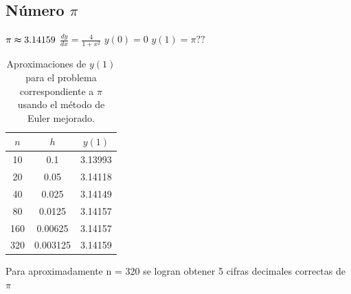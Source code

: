 \documentclass[12pt,a4paper]{article}
\begin{document}
            \subsection{Número $\pi$}
            \vspace*{1cm}
            $\pi \thickapprox 3.14159$\hspace*{1cm}
            $\frac{dy}{d x} = \frac{4}{1+x^2}$\hspace*{1cm}
            $y(0) = 0$\hspace*{1cm}
            $y(1) = \pi ??$\\
            \begin{table}[H]
                \centering
                \begin{tabular}{ccc}
                \toprule
                \(n\) & \(h\) & \(y(1)\) \\
                \midrule
                10   & 0.1     & 3.13993 \\
                20   & 0.05    & 3.14118 \\
                40   & 0.025   & 3.14149 \\
                80   & 0.0125  & 3.14157 \\
                160  & 0.00625 & 3.14157 \\
                320  & 0.003125& 3.14159 \\
                \bottomrule
                \end{tabular}
                \caption{Aproximaciones de \(y(1)\) para el problema correspondiente a \(\pi\) usando el método de Euler mejorado.}
                \label{tab:aproximacion_pi}
            \end{table}
            Para aproximadamente n = 320 se logran obtener 5 cifras decimales correctas de $\pi$
\end{document}
